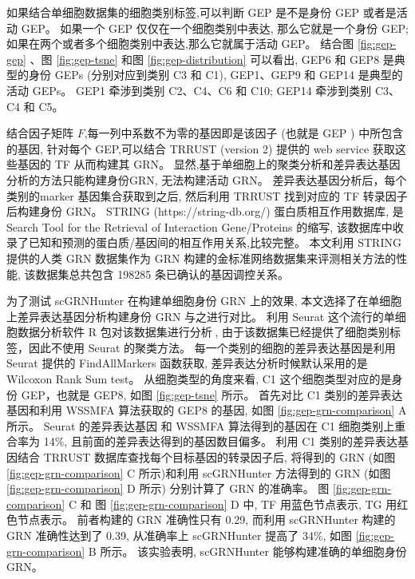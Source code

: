 如果结合单细胞数据集的细胞类别标签,可以判断 GEP 是不是身份 GEP 或者是活动 GEP。
如果一个 GEP 仅仅在一个细胞类别中表达, 那么它就是一个身份 GEP;
如果在两个或者多个细胞类别中表达,那么它就属于活动 GEP。
结合图 \ref{fig:gep-gep} 、图 \ref{fig:gep-tsne} 和图 \ref{fig:gep-distribution} 可以看出, 
GEP6 和 GEP8 是典型的身份 GEPs (分别对应到类别 C3 和 C1), GEP1、GEP9 和 GEP14 是典型的活动 GEPs。
GEP1 牵涉到类别 C2、C4、C6 和 C10; GEP14 牵涉到类别 C3、C4 和 C5。


结合因子矩阵 $F$,每一列中系数不为零的基因即是该因子 (也就是 GEP ) 中所包含的基因,
针对每个 GEP,可以结合 TRRUST (version 2) 提供的 web service 获取这些基因的 TF 从而构建其 GRN。
显然,基于单细胞上的聚类分析和差异表达基因分析的方法只能构建身份GRN, 无法构建活动 GRN。
差异表达基因分析后，每个类别的marker 基因集合获取到之后, 
然后利用 TRRUST 找到对应的 TF 转录因子后构建身份 GRN。
STRING (https://string-db.org/) 蛋白质相互作用数据库,
是 Search Tool for the Retrieval of Interaction Gene/Proteins 的缩写,
该数据库中收录了已知和预测的蛋白质/基因间的相互作用关系,比较完整。
本文利用 STRING 提供的人类 GRN 数据集作为 GRN 构建的金标准网络数据集来评测相关方法的性能, 该数据集总共包含 198285 条已确认的基因调控关系。

为了测试 scGRNHunter 在构建单细胞身份 GRN 上的效果,
本文选择了在单细胞上差异表达基因分析构建身份 GRN 与之进行对比。 
利用 Seurat 这个流行的单细胞数据分析软件 R 包对该数据集进行分析,
由于该数据集已经提供了细胞类别标签，因此不使用 Seurat 的聚类方法。
每一个类别的细胞的差异表达基因是利用 Seurat 提供的 FindAllMarkers 函数获取, 差异表达分析时候默认采用的是 Wilcoxon Rank Sum test。
从细胞类型的角度来看, C1 这个细胞类型对应的是身份 GEP，也就是 GEP8, 如图 \ref{fig:gep-tsne} 所示。
首先对比 C1 类别的差异表达基因和利用 WSSMFA 算法获取的 GEP8 的基因, 如图 \ref{fig:gep-grn-comparison} A 所示。
Seurat 的差异表达基因 和 WSSMFA 算法得到的基因在 C1 细胞类别上重合率为 14\%, 且前面的差异表达得到的基因数目偏多。 
利用 C1 类别的差异表达基因结合 TRRUST 数据库查找每个目标基因的转录因子后, 将得到的 GRN (如图 \ref{fig:gep-grn-comparison} C 所示)和利用 scGRNHunter 方法得到的 GRN (如图 \ref{fig:gep-grn-comparison} D 所示)
分别计算了 GRN 的准确率。
图 \ref{fig:gep-grn-comparison} C 和 图 \ref{fig:gep-grn-comparison} D 中, TF 用蓝色节点表示, TG 用红色节点表示。
前者构建的 GRN 准确性只有 0.29, 
而利用 scGRNHunter 构建的 GRN 准确性达到了 0.39, 从准确率上 scGRNHunter 提高了 34\%, 如图 \ref{fig:gep-grn-comparison} B 所示。
该实验表明, scGRNHunter 能够构建准确的单细胞身份 GRN。

